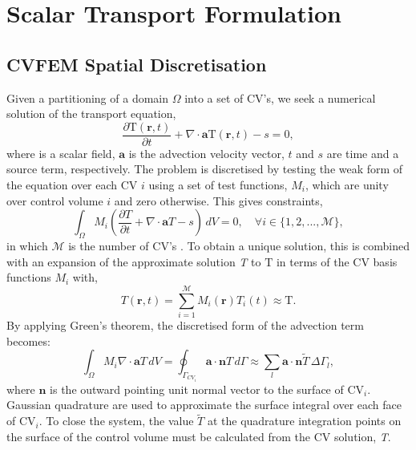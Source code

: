 \documentclass[preprint,authoryear,12pt]{elsarticle}
\begin{document}
\section{Scalar Transport Formulation}\label{transport_methods_section}

\subsection{CVFEM Spatial Discretisation}\label{Section:CVFEMDiscretisation}
Given a partitioning of a domain $\Omega$ into a set of CV's, we seek a numerical solution of the transport equation,
\begin{equation}
  \displaystyle\frac{\partial \text{T}(\mathbf{r},t) }{\partial t} +  \nabla\cdot \textbf{a} \text{T}(\mathbf{r},t) - s = 0,
  \label{traneq}
\end{equation}
where  is a scalar field, $\mathbf{a}$ is the advection velocity vector, $\textit{t}$ and $\textit{s}$ are time and a source term, respectively. The problem is discretised by testing the weak form of the equation over each CV $i$ using a set of test functions, $M_{i}$, which are unity over control volume $i$ and zero otherwise. This gives constraints,
\begin{equation}
  \int_{\Omega} M_{i} \left( \frac{\partial T }{\partial t} + \nabla\cdot \textbf{a} T - s \right)\,d V = 0, \quad \forall i \in \{1,2,..., \mathcal{M}\},
  \label{CV1}
\end {equation}
in which $\mathcal{M}$ is the number of CV's \citep[which is not necessarily equal to the $\mathcal{N}$ nodes of the underlying FEM mesh,][]{cordazzo_2004, eymard_1994}. To obtain a unique solution, this is combined with an expansion of the approximate solution {\it T} to $\text{T}$ in terms of the CV basis functions $M_{i}$ with,
\begin{equation}  
  T\left(\mathbf{r},t\right)=\sum\limits_{i=1}^{\mathcal{M}} M_{i}\left(\mathbf{r}\right) T_{i}(t) \approx \text{T}.
  \label{transpeqn_approxfield}
\end{equation}
By applying Green's theorem, the discretised form of the advection term becomes:
\begin{equation}
  \int_{\Omega} M_{i} \nabla \cdot \mathbf{a} T \,d V =
  \oint_{\Gamma_{CV_{i}}} \mathbf{a}\cdot \mathbf{n} T \,d \Gamma
  \approx \sum_{l} \mathbf{a}\cdot \mathbf{n}\widetilde{T} \,\Delta
  \Gamma_l,
  \label{transpeqn_green}
\end{equation}
\noindent
where $\mathbf{n}$ is the outward pointing unit normal vector to the surface of CV$_{i}$. Gaussian quadrature are used to approximate the surface integral over each face of CV$_{i}$. To close the system, the value $\widetilde{T}$ at the quadrature integration points on the surface of the control volume must be calculated from the CV solution, \textit{T}.
\end{document}
